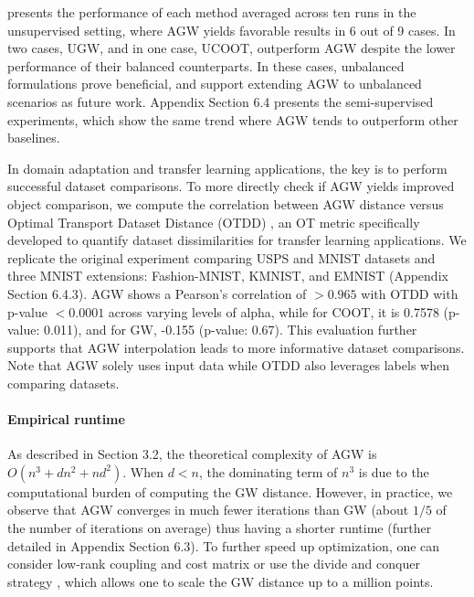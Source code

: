  presents the performance of each method averaged across ten runs in
the unsupervised setting, where AGW yields favorable results in 6 out of 9 cases. In two cases,
UGW, and in one case, UCOOT, outperform AGW despite the lower performance of
their balanced counterparts. In these cases, unbalanced formulations prove beneficial,
and support extending AGW to unbalanced scenarios as future work.
Appendix Section 6.4 presents the semi-supervised experiments,
which show the same trend where AGW tends to outperform other baselines.

In domain adaptation and transfer learning applications, the key is to perform
successful dataset comparisons. To more directly check if AGW yields improved object comparison,
we compute the correlation between AGW distance versus Optimal Transport Dataset Distance (OTDD)
\citep{Melis20}, an OT metric specifically developed to quantify dataset dissimilarities
for transfer learning applications. We replicate the original experiment comparing
USPS and MNIST datasets and three MNIST extensions: Fashion-MNIST, KMNIST, and EMNIST
(Appendix Section 6.4.3). AGW shows a Pearson's correlation of $>0.965$
with OTDD with p-value $<0.0001$ across varying levels of alpha, while for COOT, it is 0.7578
(p-value: 0.011), and for GW, -0.155 (p-value: 0.67).
This evaluation further supports that AGW interpolation leads to more informative dataset comparisons.
Note that AGW solely uses input data while OTDD also leverages labels when comparing datasets.

\paragraph{Empirical runtime} As described in Section 3.2,
the theoretical complexity of AGW is $O(n^3 + dn^2 + nd^2)$. When $d<n$,
the dominating term of $n^3$ is due to the computational burden of computing the GW distance.
However, in practice, we observe that AGW converges in much fewer iterations than GW
(about $1/5$ of the number of iterations on average) thus having a shorter runtime
(further detailed in Appendix Section 6.3). To further speed up optimization,
one can consider low-rank coupling and cost matrix \citep{Meyer21b} or
use the divide and conquer strategy \citep{Chowdhury21a},
which allows one to scale the GW distance up to a million points.



